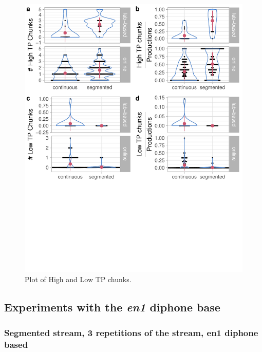 \documentclass[]{article}
\begin{document}
\begin{figure}

{\centering \includegraphics[width=0.8\linewidth]{segmentation_recall_combined_files/figure-latex/recall-tp-chunks-raw-plot-1} 

}

\caption{Plot of High and Low TP chunks.}\label{fig:recall-tp-chunks-raw-plot}
\end{figure}

\clearpage

\subsection{\texorpdfstring{Experiments with the \emph{en1} diphone
base}{Experiments with the en1 diphone base}}\label{experiments-with-the-en1-diphone-base}

\subsubsection{Segmented stream, 3 repetitions of the stream, en1
diphone
based}\label{segmented-stream-3-repetitions-of-the-stream-en1-diphone-based}
\end{document}
